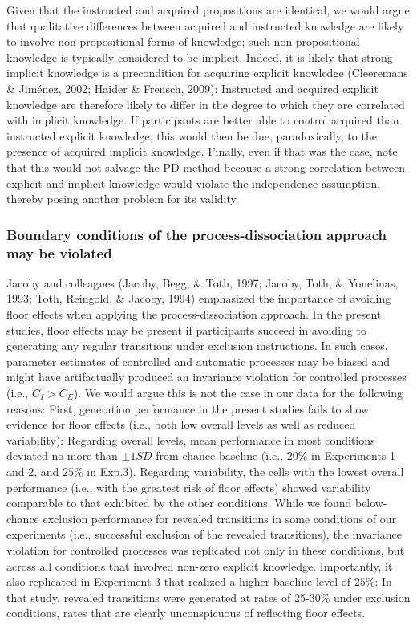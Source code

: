 \documentclass[floatsintext,doc]{apa6}
\theoremstyle{definition}
\theoremstyle{definition}
\theoremstyle{definition}
\theoremstyle{remark}
\begin{document}
Given that the instructed and acquired propositions are identical, we
would argue that qualitative differences between acquired and instructed
knowledge are likely to involve non-propositional forms of knowledge;
such non-propositional knowledge is typically considered to be implicit.
Indeed, it is likely that strong implicit knowledge is a precondition
for acquiring explicit knowledge (Cleeremans \& Jiménez, 2002; Haider \&
Frensch, 2009): Instructed and acquired explicit knowledge are therefore
likely to differ in the degree to which they are correlated with
implicit knowledge. If participants are better able to control acquired
than instructed explicit knowledge, this would then be due,
paradoxically, to the presence of acquired implicit knowledge. Finally,
even if that was the case, note that this would not salvage the PD
method because a strong correlation between explicit and implicit
knowledge would violate the independence assumption, thereby posing
another problem for its validity.

\subsubsection{Boundary conditions of the process-dissociation approach
may be
violated}\label{boundary-conditions-of-the-process-dissociation-approach-may-be-violated}

Jacoby and colleagues (Jacoby, Begg, \& Toth, 1997; Jacoby, Toth, \&
Yonelinas, 1993; Toth, Reingold, \& Jacoby, 1994) emphasized the
importance of avoiding floor effects when applying the
process-dissociation approach. In the present studies, floor effects may
be present if participants succeed in avoiding to generating any regular
transitions under exclusion instructions. In such cases, parameter
estimates of controlled and automatic processes may be biased and might
have artifactually produced an invariance violation for controlled
processes (i.e., \(C_I > C_E\)). We would argue this is not the case in
our data for the following reasons: First, generation performance in the
present studies fails to show evidence for floor effects (i.e., both low
overall levels as well as reduced variability): Regarding overall
levels, mean performance in most conditions deviated no more than
\(\pm 1 \mathit{SD}\) from chance baseline (i.e., \(20\%\) in
Experiments 1 and 2, and \(25\%\) in Exp.3). Regarding variability, the
cells with the lowest overall performance (i.e., with the greatest risk
of floor effects) showed variability comparable to that exhibited by the
other conditions. While we found below-chance exclusion performance for
revealed transitions in some conditions of our experiments (i.e.,
successful exclusion of the revealed transitions), the invariance
violation for controlled processes was replicated not only in these
conditions, but across all conditions that involved non-zero explicit
knowledge. Importantly, it also replicated in Experiment 3 that realized
a higher baseline level of \(25\%\): In that study, revealed transitions
were generated at rates of 25-30\% under exclusion conditions, rates
that are clearly unconspicuous of reflecting floor effects.
\end{document}
